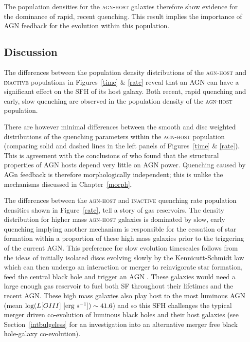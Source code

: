 The population densities for the \textsc{agn-host} galaxies therefore show evidence for the dominance of rapid, recent quenching. This result implies the importance of AGN feedback for the evolution within this population.

\subsection{Discussion}\label{dis}

The differences between the population density distributions of the \textsc{agn-host} and \textsc{inactive} populations in Figures~\ref{time} \& \ref{rate} reveal that an AGN can have a significant effect on the SFH of its host galaxy. Both recent, rapid quenching and early, slow quenching are observed in the population density of the \textsc{agn-host} population. 

There are however minimal differences between the smooth and disc weighted distributions of the quenching parameters within the \textsc{agn-host} population (comparing solid and dashed lines in the left panels of Figures~\ref{time} \& \ref{rate}). This is agreement with the conclusions of \citet{kauffmann03b} who found that the structural properties of AGN hosts depend very little on AGN power. Quenching caused by AGn feedback is therefore morphologically independent; this is unlike the mechanisms discussed in Chapter~\ref{morph}.

The differences between the \textsc{agn-host} and \textsc{inactive} quenching rate population densities shown in Figure~\ref{rate}, tell a story of gas reservoirs. The density distribution for higher mass \textsc{agn-host} galaxies is dominated by slow, early quenching implying another mechanism is responsible for the cessation of star formation within a proportion of these high mass galaxies prior to the triggering of the current AGN.  This preference for slow evolution timescales follows from the ideas of initially isolated discs evolving slowly by the Kennicutt-Schmidt \citep{Schmidt59, Kennicutt97} law which can then undergo an interaction or merger to reinvigorate star formation, feed the central black hole and trigger an AGN \citep{Varela04, emsellem15}. These galaxies would need a large enough gas reservoir to fuel both SF throughout their lifetimes and the recent AGN. These high mass galaxies also play host to the most luminous AGN (mean $\log (L[OIII] ~[\rm{erg}~s^{-1}]) \sim 41.6$) and so this SFH challenges the typical merger driven co-evolution of luminous black holes and their host galaxies (see Section~\ref{intbulgeless} for an investigation into an alternative merger free black hole-galaxy co-evolution). 


